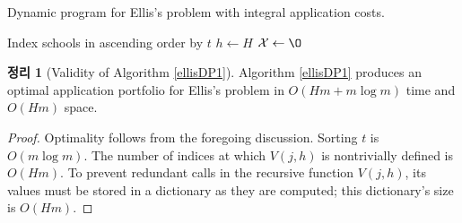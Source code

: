 \documentclass[12pt]{article} %
\newcommand{\lIfElse}[3]{\lIf{#1}{#2 \textbf{else}~#3}}
\newtheorem{theorem}{Theorem}
\theoremstyle{definition}
\newtheorem{theorem}{정리}
\theoremstyle{definition}
\begin{document}
\begin{algorithm}[H] 
\caption{Dynamic program for Ellis's problem with integral application costs.} \label{ellisDP1}
\KwData{Utility values $t \in[0, \infty)^m$, admissions probabilities $f \in [0, 1]^m$, application costs $g \in \mathbb{N}^m$, budget $H \in\mathbb{N}$.}
Index schools in ascending order by $t$\;
$h \gets H$\;
$\mathcal{X} \gets \O$\;
\end{algorithm}

\begin{theorem}[Validity of Algorithm \ref{ellisDP1}]
Algorithm \ref{ellisDP1} produces an optimal application portfolio for Ellis's problem in $O(H m + m \log m)$ time and $O(H m)$ space.
\end{theorem}

\begin{proof}
Optimality follows from the foregoing discussion. Sorting $t$ is $O(m \log m)$.  The number of indices at which $V(j, h)$ is nontrivially defined is $O(Hm)$. To prevent redundant calls in the recursive function $V(j, h)$, its values must be stored in a dictionary as they are computed; this dictionary’s size is $O(Hm)$. 
\end{proof}
\end{document}
